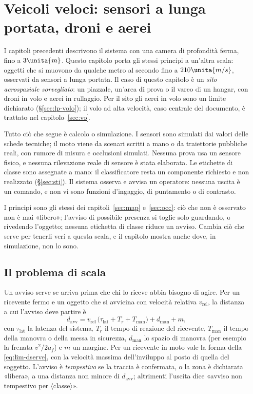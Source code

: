 \section{Veicoli veloci: sensori a lunga portata, droni e aerei}\label{sec:lp}

I capitoli precedenti descrivono il sistema con una camera di profondità ferma, fino a $3\unita{m}$. Questo capitolo porta gli stessi principi a un'altra scala: oggetti che si muovono da qualche metro al secondo fino a $210\unita{m/s}$, osservati da sensori a lunga portata. Il caso di questo capitolo è un \emph{sito aerospaziale sorvegliato}: un piazzale, un'area di prova o il varco di un hangar, con droni in volo e aerei in rullaggio. Per il sito gli aerei in volo sono un limite dichiarato (\S\ref{sec:lp-volo}); il volo ad alta velocità, caso centrale del documento, è trattato nel capitolo~\ref{sec:vo}.

Tutto ciò che segue è calcolo o simulazione. I sensori sono simulati dai valori delle schede tecniche; il moto viene da scenari scritti a mano o da traiettorie pubbliche reali, con rumore di misura e occlusioni simulati. Nessuna prova usa un sensore fisico, e nessuna rilevazione reale di sensore è stata elaborata. Le etichette di classe sono assegnate a mano: il classificatore resta un componente richiesto e non realizzato (\S\ref{sec:sti}). Il sistema osserva e avvisa un operatore: nessuna uscita è un comando, e non vi sono funzioni d'ingaggio, di puntamento o di contrasto.

I principi sono gli stessi dei capitoli~\ref{sec:map} e~\ref{sec:occ}: ciò che non è osservato non è mai «libero»; l'avviso di possibile presenza si toglie solo guardando, o rivedendo l'oggetto; nessuna etichetta di classe riduce un avviso. Cambia ciò che serve per tenerli veri a questa scala, e il capitolo mostra anche dove, in simulazione, non lo sono.

\subsection{Il problema di scala}\label{sec:lp-scala}

Un avviso serve se arriva prima che chi lo riceve abbia bisogno di agire. Per un ricevente fermo e un oggetto che si avvicina con velocità relativa $v_{\mathrm{rel}}$, la distanza a cui l'avviso deve partire è
\begin{equation}\label{eq:lp-davv}
d_{\mathrm{avv}} = v_{\mathrm{rel}}\,\bigl(\tau_{\mathrm{lat}}+T_r+T_{\mathrm{man}}\bigr)+d_{\mathrm{man}}+m ,
\end{equation}
con $\tau_{\mathrm{lat}}$ la latenza del sistema, $T_r$ il tempo di reazione del ricevente, $T_{\mathrm{man}}$ il tempo della manovra o della messa in sicurezza, $d_{\mathrm{man}}$ lo spazio di manovra (per esempio la frenata $v^2/2a_f$) e $m$ un margine. Per un ricevente in moto vale la forma della \eqref{eq:lim-dserve}, con la velocità massima dell'inviluppo al posto di quella del soggetto. L'avviso è \emph{tempestivo} se la traccia è confermata, o la zona è dichiarata «libera», a una distanza non minore di $d_{\mathrm{avv}}$; altrimenti l'uscita dice «avviso non tempestivo per $\langle$classe$\rangle$».

